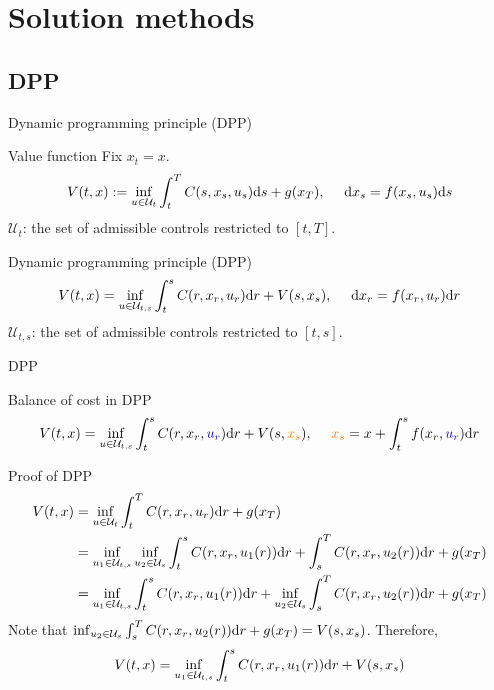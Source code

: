 \documentclass[color=usenames,dvipsnames]{beamer}
\newcommand{\ds}{\text{\normalfont d}s}
\newcommand{\dr}{\text{\normalfont d}r}
\newcommand{\dx}{\text{\normalfont d}x}
\begin{document}
\section{Solution methods}
\subsection{DPP}
\begin{frame}{Dynamic programming principle (DPP)}
    \begin{block}
        {Value function}
        Fix $x_t=x$.
\[
    V(t,x):= \inf_{u\in\mathcal{U}_{t}}\int_t^TC(s,x_s,u_s){{\ds}}+g(x_T),~~~~{\dx}_s=f(x_s,u_s){{\ds}}
\]
$\mathcal{U}_{t}$: the set of admissible controls restricted to $[t,T]$.
    \end{block}
    \begin{block}
        {Dynamic programming principle (DPP)}
        \[
        V(t,x) =\inf_{u\in\mathcal{U}_{t,s}}\int_t^sC(r,x_r,u_r){{\dr}}+V(s,x_s),~~~~{\dx}_r=f(x_r,u_r){{\dr}}
        \]
    $\mathcal{U}_{t,s}$: the set of admissible controls restricted to $[t,s]$.   
    \end{block}
\end{frame}
\begin{frame}{DPP}
    \begin{block}
        {Balance of cost in DPP}
        \[
        V(t,x) =\inf_{u\in\mathcal{U}_{t,s}}\int_t^sC(r,x_r,{\color{blue}u_r}){{\dr}}+V(s,{\color{orange}x_s}),~~~~{\color{orange}{x}_s}=x+\int_t^sf(x_r,{\color{blue}u_r}){{\dr}}
        \]
    \end{block}
\end{frame}
\begin{frame}{Proof of DPP}
     \[
    \begin{split}
        V(t,x)&= \inf_{u\in\mathcal{U}_{t}}\int_t^TC(r,x_r,u_r){{\dr}}+g(x_T)\\
        &= \inf_{u_1\in\mathcal{U}_{t,s}}\inf_{u_2\in\mathcal{U}_{s}}\int_t^sC(r,x_r,u_1(r)){{\dr}}+\int_s^TC(r,x_r,u_2(r)){{\dr}}+g(x_T)\\
        &=
        \inf_{u_1\in\mathcal{U}_{t,s}} \int_t^sC(r,x_r,u_1(r)){{\dr}} + \inf_{u_2\in\mathcal{U}_{s}}\int_s^TC(r,x_r,u_2(r)){{\dr}}+g(x_T)\\
    \end{split}
    \]
    Note that $\inf_{u_2\in\mathcal{U}_{s}}\int_s^TC(r,x_r,u_2(r)){{\dr}}+g(x_T)=V(s,x_s)$. Therefore,
     \[
        V(t,x)= 
        \inf_{u_1\in\mathcal{U}_{t,s}} \int_t^sC(r,x_r,u_1(r)){{\dr}} + V(s,x_s)
    \]
\end{frame}
\end{document}
